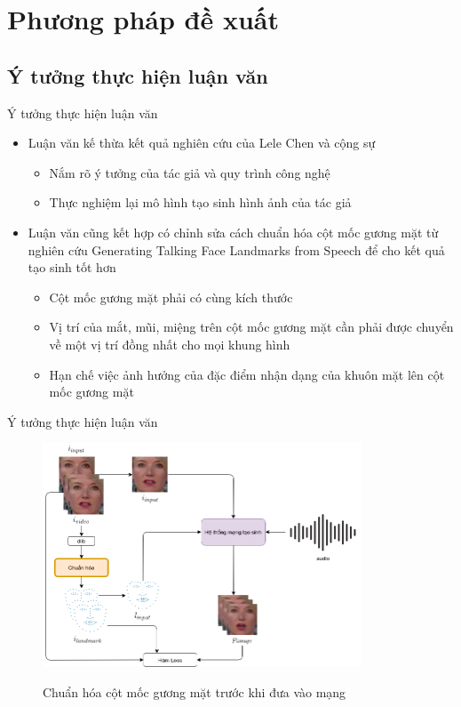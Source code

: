 \section{Phương pháp đề xuất}\label{sec:method}
\frame{\tableofcontents[currentsection]}

\subsection{Ý tưởng thực hiện luận văn}
\begin{frame}{Ý tưởng thực hiện luận văn}
    \begin{itemize}
        \item Luận văn kế thừa kết quả nghiên cứu của Lele Chen và cộng sự \cite{chen2019}
        \begin{itemize}
            \item Nắm rõ ý tưởng của tác giả và quy trình công nghệ
            \item Thực nghiệm lại mô hình tạo sinh hình ảnh của tác giả
        \end{itemize}
        \item Luận văn cũng kết hợp có chỉnh sửa cách chuẩn hóa cột mốc gương mặt từ nghiên cứu Generating Talking Face Landmarks from Speech\cite{gen_face_landmark} để cho kết quả tạo sinh tốt hơn
        \begin{itemize}
            \item Cột mốc gương mặt phải có cùng kích thước
            \item Vị trí của mắt, mũi, miệng trên cột mốc gương mặt cần phải được chuyển về một vị trí đồng nhất cho mọi khung hình
            \item Hạn chế việc ảnh hưởng của đặc điểm nhận dạng của khuôn mặt lên cột mốc gương mặt
        \end{itemize}
    \end{itemize}
\end{frame}

\begin{frame}{Ý tưởng thực hiện luận văn}
    \begin{figure}[H]
        \centering
        \includegraphics[width=9.5cm]{images/processing-contrib.png}
        \label{fig:processing-contrib}
        \caption{Chuẩn hóa cột mốc gương mặt trước khi đưa vào mạng}
    \end{figure}
\end{frame}

